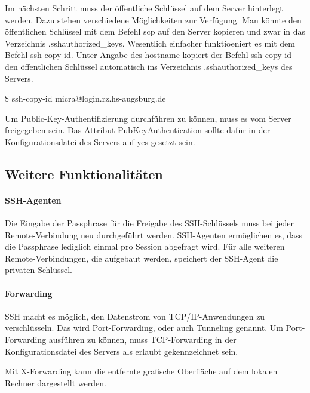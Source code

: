 \documentclass[ngerman,pdf]{wkcms}    %
\begin{document}
Im nächsten Schritt muss der öffentliche Schlüssel auf dem Server hinterlegt werden. Dazu stehen verschiedene Möglichkeiten zur Verfügung. Man könnte den öffentlichen Schlüssel mit dem Befehl \IT scp auf den Server kopieren und zwar in das Verzeichnis \IT .ssh\/authorized\_keys. Wesentlich einfacher funktioeniert es mit dem Befehl \IT ssh-copy-id. Unter Angabe des \IT hostname kopiert der Befehl \IT ssh-copy-id den öffentlichen Schlüssel automatisch ins Verzeichnis \IT .ssh\/authorized\_keys des Servers.

\begin{program}
\$ ssh-copy-id micra@login.rz.hs-augsburg.de
\end{program}

Um Public-Key-Authentifizierung durchführen zu können, muss es vom Server freigegeben sein. Das Attribut \IT PubKeyAuthentication sollte dafür in der Konfigurationsdatei des Servers auf \IT yes gesetzt sein. \cite [S. 116]{openssh_book}

\subsection{Weitere Funktionalitäten}

\paragraph{SSH-Agenten}
Die Eingabe der Passphrase für die Freigabe des SSH-Schlüssels muss bei jeder Remote-Verbindung neu durchgeführt werden. SSH-Agenten ermöglichen es,
dass die Passphrase lediglich einmal pro Session abgefragt wird. Für alle weiteren Remote-Verbindungen, die aufgebaut werden, speichert der SSH-Agent die privaten Schlüssel. \cite[S. 230]{SSH} \cite[S. 132]{openssh_book}

\paragraph{Forwarding}

SSH macht es möglich, den Datenstrom von TCP/IP-Anwendungen zu verschlüsseln.
Das wird \IT Port-Forwarding, oder auch \IT Tunneling genannt. \cite[S. 337]{SSH} Um Port-Forwarding ausführen zu können, muss TCP-Forwarding in der Konfigurationsdatei des Servers als erlaubt gekennzeichnet sein. \cite[S. 151]{openssh_book}

Mit \IT X-Forwarding kann die entfernte grafische Oberfläche auf dem lokalen Rechner dargestellt werden. 
\end{document}
